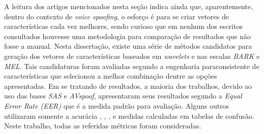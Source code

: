 		\par A leitura dos artigos mencionados nesta seção indica ainda que, aparentemente, dentro do contexto de \textit{voice spoofing}, o esforço é para se criar vetores de características cada vez melhores, sendo curioso que em nenhum dos escritos consultados houvesse uma metodologia para comparação de resultados que não fosse a manual. Nesta dissertação, existe uma série de métodos candidatos para geração dos vetores de características baseados em \textit{wavelets} e nas escalas \textit{BARK} e \textit{MEL}. Tais candidaturas foram avaliadas segundo a engenharia paraconsistente de características que selecionou a melhor combinação dentre as opções apresentadas. Em se tratando de resultados, a maioria dos trabalhos, devido ao uso das bases \textit{SAS} e \textit{AVspoof}, apresentaram seus resultados segundo a \textit{Equal Error Rate (EER)} que é a medida padrão para avaliação. Alguns outros utilizaram somente a acurácia \cite{8396208}, \cite{ISI:000473343500086}, \cite{DiqunYan2019}, \cite{Ren2019} e medidas calculadas em tabelas de confusão. Neste trabalho, todas as referidas métricas foram consideradas.\\
